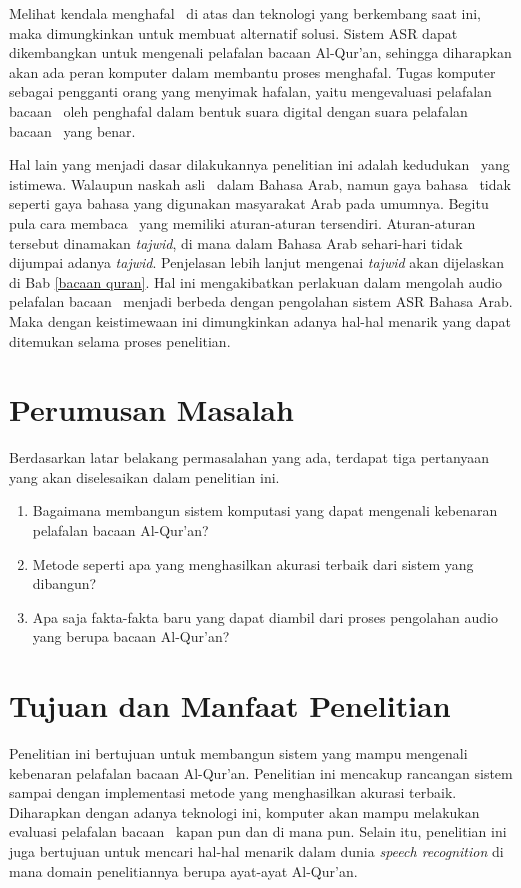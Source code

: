 	Melihat kendala menghafal \quran~di atas dan teknologi yang berkembang saat ini, maka dimungkinkan untuk membuat alternatif solusi. Sistem ASR dapat dikembangkan untuk mengenali pelafalan bacaan Al-Qur'an, sehingga diharapkan akan ada peran komputer dalam membantu proses menghafal. Tugas komputer sebagai pengganti orang yang menyimak hafalan, yaitu mengevaluasi pelafalan bacaan \quran~oleh penghafal dalam bentuk suara digital dengan suara pelafalan bacaan \quran~yang benar.
	
	Hal lain yang menjadi dasar dilakukannya penelitian ini adalah kedudukan \quran~yang istimewa. Walaupun naskah asli \quran~dalam Bahasa Arab, namun gaya bahasa \quran~tidak seperti gaya bahasa yang digunakan masyarakat Arab pada umumnya. Begitu pula cara membaca \quran~yang memiliki aturan-aturan tersendiri. Aturan-aturan tersebut dinamakan \textit{tajwid}, di mana dalam Bahasa Arab sehari-hari tidak dijumpai adanya \textit{tajwid}. Penjelasan lebih lanjut mengenai \textit{tajwid} akan dijelaskan di Bab \ref{bacaan quran}. Hal ini mengakibatkan perlakuan dalam mengolah audio pelafalan bacaan \quran~menjadi berbeda dengan pengolahan sistem ASR Bahasa Arab. Maka dengan keistimewaan ini dimungkinkan adanya hal-hal menarik yang dapat ditemukan selama proses penelitian.

\section{Perumusan Masalah}
Berdasarkan latar belakang permasalahan yang ada, terdapat tiga pertanyaan yang akan diselesaikan dalam penelitian ini.
\begin{enumerate}
	\item Bagaimana membangun sistem komputasi yang dapat mengenali kebenaran pelafalan bacaan Al-Qur'an?
	\item Metode seperti apa yang menghasilkan akurasi terbaik dari sistem yang dibangun?
	\item Apa saja fakta-fakta baru yang dapat diambil dari proses pengolahan audio yang berupa bacaan Al-Qur'an?
\end{enumerate}

\section{Tujuan dan Manfaat Penelitian}
Penelitian ini bertujuan untuk membangun sistem yang mampu mengenali kebenaran pelafalan bacaan Al-Qur'an. Penelitian ini mencakup rancangan sistem sampai dengan implementasi metode yang menghasilkan akurasi terbaik. Diharapkan dengan adanya teknologi ini, komputer akan mampu melakukan evaluasi pelafalan bacaan \quran~kapan pun dan di mana pun. Selain itu, penelitian ini juga bertujuan untuk mencari hal-hal menarik dalam dunia \textit{speech recognition} di mana domain penelitiannya berupa ayat-ayat Al-Qur'an.

